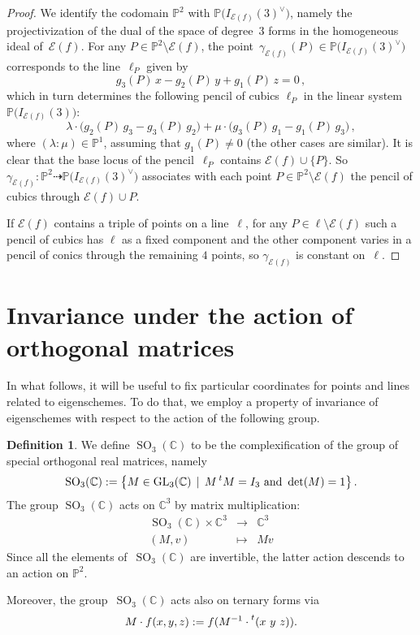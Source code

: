 \documentclass[a4paper, 11pt, reqno]{amsart}
\theoremstyle{plain}
\theoremstyle{definition}
\newtheorem{definition}[lemma]{Definition}
\newcommand{\C}{\mathbb{C}}
\newcommand{\p}{\mathbb{P}}
\newcommand{\SO}{\operatorname{SO}}
\newcommand{\Eig}[1]{\mathcal{E}\!\left( {#1} \right)}
\begin{document}
\begin{proof}
%
We identify the codomain $\p^2$ with $\p\bigl(I_{\Eig{f}}(3)^{\vee}\bigr)$, namely the projectivization of the dual of the space of degree~$3$ forms in the homogeneous ideal of~$\Eig{f}$.
For any $P \in \p^2 \setminus \Eig{f}$, the point~$\gamma_{\Eig{f}} (P)\in \p \bigl(I_{\Eig{f}}(3)^{\vee}\bigr)$ corresponds to the line~$\ell_P$ given by
\[
  g_3 (P) \, x - g_2(P) \, y + g_1(P) \, z = 0 \,,
\]
%
which in turn determines the following
pencil of cubics $\ell_P$ in the linear system $\p \bigl(I_{\Eig{f}}(3)\bigr)$:
%
\[
  \lambda \cdot \bigl( g_2(P) \, g_3  -g_3(P) \, g_2\bigr) + \mu \cdot \bigl( g_3(P) \, g_1 - g_1(P) \, g_3 \bigr) \,,
\]
%
where $(\lambda : \mu) \in \p^1$, assuming that $g_1(P) \neq 0$ (the other cases are similar).
It is clear that the base locus of the pencil~$\ell_P$ contains $\Eig{f} \cup \{P\}$.
So $\gamma_{\Eig{f}} \colon \p^2 \dasharrow \p \bigl( I_{\Eig{f}}(3)^\vee \bigr)$
associates with each point $P \in \p^2 \setminus \Eig{f}$ the pencil of cubics through $\Eig{f} \cup P$.

If $\Eig{f}$ contains a triple of points on a line~$\ell$, for any $P \in \ell \setminus \Eig{f}$ such a pencil of cubics has $\ell$ as a fixed component and the other component varies in a pencil of conics through the remaining $4$ points, so $\gamma_{\Eig{f}}$ is constant on~$\ell$.
\end{proof}


\section{Invariance under the action of orthogonal matrices}
\label{invariance}

In what follows, it will be useful to fix particular coordinates for points and lines related to eigenschemes.
To do that, we employ a property of invariance of eigenschemes with respect to the action of the following group.

\begin{definition}
We define $\SO_3(\C)$ to be the complexification of the group of special orthogonal real matrices, namely
%
\[
  \SO_3(\C) :=
  \bigl\{
    M \in \mathrm{GL}_3(\C) \, \mid \,
    M \prescript{t} {}M = I_3 \ \text{and} \ \det(M) = 1
  \bigr\} \,.
\]
%
The group $\SO_3(\C)$ acts on $\C^3$ by matrix multiplication:
%
\[
  \begin{array}{ccc}
    \SO_3(\C) \times \C^3 & \rightarrow & \C^3 \\
    (M, v) & \mapsto & Mv
  \end{array}
\]
%
Since all the elements of~$\SO_3(\C)$ are invertible, the latter action descends to an action on $\p^2$.

Moreover, the group~$\SO_3(\C)$ acts also on ternary forms via
%
\[
  M \cdot f (x,y,z) := f(M^{-1} \cdot \prescript{t} {}( x \ y \ z ) ).
\]
%
\end{definition}
\end{document}
